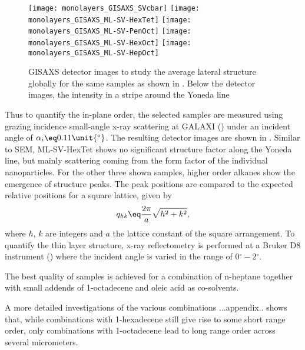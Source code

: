 \documentclass[\main/dresen_thesis.tex]{subfiles}
\begin{document}
  \begin{figure}[tb]
    \centering
    \texttt{[image: monolayers\_GISAXS\_SVcbar]}
    \texttt{[image: monolayers\_GISAXS\_ML-SV-HexTet]}
    \texttt{[image: monolayers\_GISAXS\_ML-SV-PenOct]}
    \texttt{[image: monolayers\_GISAXS\_ML-SV-HexOct]}
    \texttt{[image: monolayers\_GISAXS\_ML-SV-HepOct]}
    \caption{\label{fig:monolayers:preparation:solventVariation:gisaxs}GISAXS detector images to study the average lateral structure globally for the same samples as shown in . Below the detector images, the intensity in a stripe around the Yoneda line  }
  \end{figure}
  Thus to quantify the in-plane order, the selected samples are measured using grazing incidence small-angle x-ray scattering at GALAXI () under an incident angle of $\alpha_i \eq 0.11 \unit{^\circ}$.
  The resulting detector images are shown in .
  Similar to SEM, ML-SV-HexTet shows no significant structure factor along the Yoneda line, but mainly scattering coming from the form factor of the individual nanoparticles.
  For the other three shown samples, higher order alkanes show the emergence of structure peaks.
  The peak positions are compared to the expected relative positions for a square lattice, given by
  \begin{align}
    q_{hk} \eq \frac{2 \pi}{a} \sqrt{h^2 + k^2},
  \end{align}
  where $h$, $k$ are integers and $a$ the lattice constant of the square arrangement.
  To quantify the thin layer structure, x-ray reflectometry is performed at a Bruker D8 instrument () where the incident angle is varied in the range of $0\unit{^\circ} - 2\unit{^\circ}$.

  The best quality of samples is achieved for a combination of n-heptane together with small addends of 1-octadecene and oleic acid as co-solvents.


  A more detailed investigations of the various combinations
  ...appendix..
  shows that, while combinations with 1-hexadecene still give rise to some short range order, only combinations with 1-octadecene lead to long range order across several micrometers.
\end{document}
